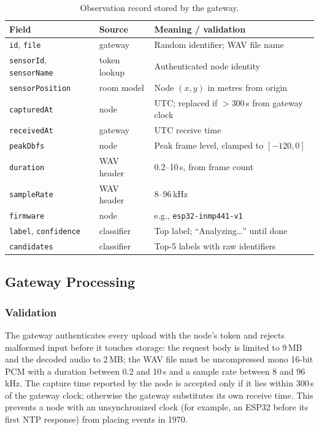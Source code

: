 \documentclass[conference]{IEEEtran}
\begin{document}
\begin{table}[!t]
\centering
\caption{Observation record stored by the gateway.}
\label{tab:record}
\renewcommand{\arraystretch}{1.08}
\footnotesize
\setlength{\tabcolsep}{4pt}
\begin{tabular}{@{}l l p{3.55cm}@{}}
\toprule
\textbf{Field} & \textbf{Source} & \textbf{Meaning / validation} \\
\midrule
\texttt{id}, \texttt{file} & gateway & Random identifier; WAV file name \\
\texttt{sensorId}, \texttt{sensorName} & token lookup & Authenticated node identity \\
\texttt{sensorPosition} & room model & Node $(x, y)$ in metres from origin \\
\texttt{capturedAt} & node & UTC; replaced if $>300$\,s from gateway clock \\
\texttt{receivedAt} & gateway & UTC receive time \\
\texttt{peakDbfs} & node & Peak frame level, clamped to $[-120, 0]$ \\
\texttt{duration} & WAV header & 0.2--10\,s, from frame count \\
\texttt{sampleRate} & WAV header & 8--96\,kHz \\
\texttt{firmware} & node & e.g., \texttt{esp32-inmp441-v1} \\
\texttt{label}, \texttt{confidence} & classifier & Top label; ``Analyzing\ldots'' until done \\
\texttt{candidates} & classifier & Top-5 labels with raw identifiers \\
\bottomrule
\end{tabular}
\end{table}

\subsection{Gateway Processing}
\subsubsection{Validation}
The gateway authenticates every upload with the node's token and rejects malformed input before it touches storage: the request body is limited to 9\,MB and the decoded audio to 2\,MB; the WAV file must be uncompressed mono 16-bit PCM with a duration between 0.2 and 10\,s and a sample rate between 8 and 96\,kHz. The capture time reported by the node is accepted only if it lies within 300\,s of the gateway clock; otherwise the gateway substitutes its own receive time. This prevents a node with an unsynchronized clock (for example, an ESP32 before its first NTP response) from placing events in 1970.
\end{document}
